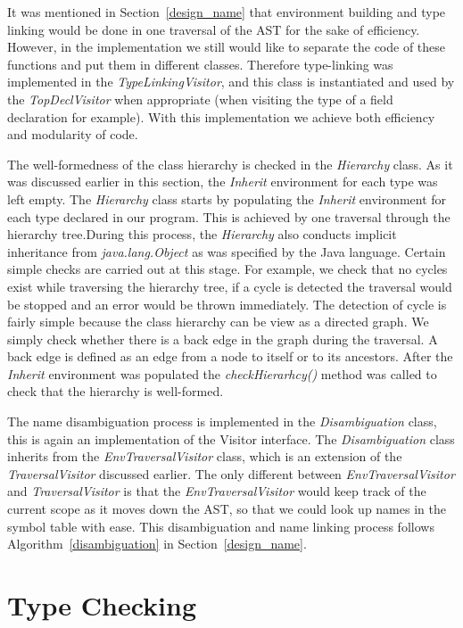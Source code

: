 \documentclass[a4paper, notitlepage]{report}
\begin{document}
It was mentioned in Section~\ref{design_name} that environment building and type linking would be done in one traversal of the AST for the sake of efficiency. However, in the implementation we still would like to separate the code of these functions and put them in different classes. Therefore type-linking was implemented in the \emph{TypeLinkingVisitor}, and this class is instantiated and used by the \emph{TopDeclVisitor} when appropriate (when visiting the type of a field declaration for example). With this implementation we achieve both efficiency and modularity of code.

The well-formedness of the class hierarchy is checked in the \emph{Hierarchy} class. As it was discussed earlier in this section, the \emph{Inherit} environment for each type was left empty. The \emph{Hierarchy} class starts by populating the \emph{Inherit} environment for each type declared in our program. This is achieved by one traversal through the hierarchy tree.During this process, the \emph{Hierarchy} also conducts implicit inheritance from \emph{java.lang.Object} as was specified by the Java language. Certain simple checks are carried out at this stage. For example, we check that no cycles exist while traversing the hierarchy tree, if a cycle is detected the traversal would be stopped and an error would be thrown immediately. The detection of cycle is fairly simple because the class hierarchy can be view as a directed graph. We simply check whether there is a back edge in the graph during the traversal. A back edge is defined as an edge from a node to itself or to its ancestors. After the \emph{Inherit} environment was populated the \emph{checkHierarhcy()} method was called to check that the hierarchy is well-formed.

The name disambiguation process is implemented in the \emph{Disambiguation} class, this is again an implementation of the Visitor interface. The \emph{Disambiguation} class inherits from the \emph{EnvTraversalVisitor} class, which is an extension of the \emph{TraversalVisitor} discussed earlier. The only different between \emph{EnvTraversalVisitor} and \emph{TraversalVisitor} is that the \emph{EnvTraversalVisitor} would keep track of the current scope as it moves down the AST, so that we could look up names in the symbol table with ease. This disambiguation and name linking process follows Algorithm~\ref{disambiguation} in Section~\ref{design_name}.

\section{Type Checking}
\end{document}

